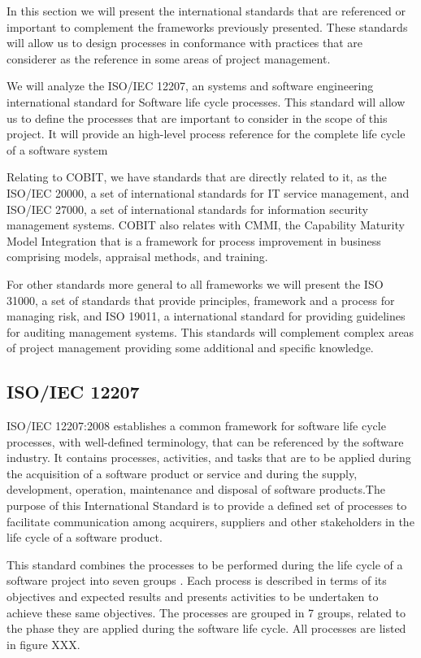 In this section we will present the international standards that are referenced or important to complement the frameworks previously presented. These standards will allow us to design processes in conformance with practices that are considerer as the reference in some areas of project management.\par
We will analyze the ISO/IEC 12207, an systems and software engineering international standard for Software life cycle processes. This standard will allow us to define the processes that are important to consider in the scope of this project. It will provide an high-level process reference for the complete life cycle of a software system\par
Relating to COBIT, we have standards that are directly related to it, as the ISO/IEC 20000, a set of international standards for IT service management, and ISO/IEC 27000, a set of international standards for information security management systems. COBIT also relates with CMMI, the Capability Maturity Model Integration that is a framework for process improvement in business comprising models, appraisal methods, and training.\par
For other standards more general to all frameworks we will present the ISO 31000, a set of standards that provide principles, framework and a process for managing risk, and ISO 19011, a international standard for providing guidelines for auditing management systems. This standards will complement complex areas of project management providing some additional and specific knowledge.

\subsection{ISO/IEC 12207}

ISO/IEC 12207:2008 establishes a common framework for software life cycle processes, with well-defined terminology, that can be referenced by the software industry. It contains processes, activities, and tasks that are to be applied during the acquisition of a software product or service and during the supply, development, operation, maintenance and disposal of software products.The purpose of this International Standard is to provide a defined set of processes to facilitate communication among acquirers, suppliers and other stakeholders in the life cycle of a software product.\par
This standard combines the processes to be performed during the life cycle of a software project into seven groups . Each process is described in terms of its objectives and expected results and presents activities to be undertaken to achieve these same objectives. The processes are grouped in 7 groups, related to the phase they are applied during the software life cycle. All processes are listed in figure XXX.

